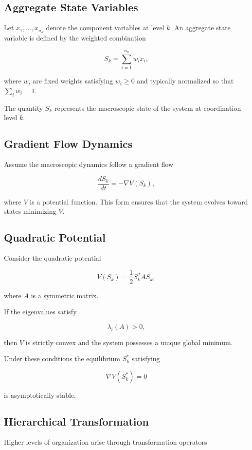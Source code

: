 \documentclass[12pt]{article}
\begin{document}
\subsection{Aggregate State Variables}

Let $x_1,\dots,x_{n_k}$ denote the component variables at level $k$.  
An aggregate state variable is defined by the weighted combination

\[
S_k = \sum_{i=1}^{n_k} w_i x_i ,
\]

where $w_i$ are fixed weights satisfying $w_i \ge 0$ and typically normalized so that $\sum_i w_i = 1$.

The quantity $S_k$ represents the macroscopic state of the system at coordination level $k$.

\subsection{Gradient Flow Dynamics}

Assume the macroscopic dynamics follow a gradient flow

\[
\frac{dS_k}{dt} = -\nabla V(S_k) ,
\]

where $V$ is a potential function. This form ensures that the system evolves toward states minimizing $V$.

\subsection{Quadratic Potential}

Consider the quadratic potential

\[
V(S_k) = \frac{1}{2} S_k^T A S_k ,
\]

where $A$ is a symmetric matrix.

If the eigenvalues satisfy

\[
\lambda_i(A) > 0 ,
\]

then $V$ is strictly convex and the system possesses a unique global minimum.

Under these conditions the equilibrium $S_k^\ast$ satisfying

\[
\nabla V(S_k^\ast) = 0
\]

is asymptotically stable.

\subsection{Hierarchical Transformation}

Higher levels of organization arise through transformation operators
\end{document}
